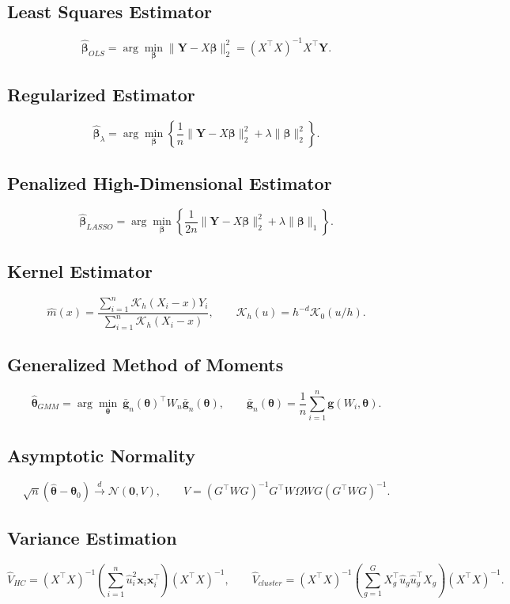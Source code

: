 \documentclass[11pt]{article}
\begin{document}
\subsection{Least Squares Estimator}
\[
\hat{\bm{\beta}}_{OLS}=\arg\min_{\bm{\beta}}\|\bm{Y}-X\bm{\beta}\|_2^2=(X^\top X)^{-1}X^\top\bm{Y}.
\]

\subsection{Regularized Estimator}
\[
\hat{\bm{\beta}}_{\lambda}=\arg\min_{\bm{\beta}}\left\{\frac{1}{n}\|\bm{Y}-X\bm{\beta}\|_2^2+\lambda\|\bm{\beta}\|_2^2\right\}.
\]

\subsection{Penalized High-Dimensional Estimator}
\[
\hat{\bm{\beta}}_{LASSO}=\arg\min_{\bm{\beta}}\left\{\frac{1}{2n}\|\bm{Y}-X\bm{\beta}\|_2^2+\lambda\|\bm{\beta}\|_1\right\}.
\]

\subsection{Kernel Estimator}

\[
\widehat m(x)
=
\frac{
\sum_{i=1}^{n}\mathcal K_h(X_i-x)Y_i
}{
\sum_{i=1}^{n}\mathcal K_h(X_i-x)
},
\qquad
\mathcal K_h(u)=h^{-d}\mathcal K_0(u/h).
\]

\subsection{Generalized Method of Moments}
\[
\hat{\bm{\theta}}_{GMM}=\arg\min_{\bm{\theta}}\ \bar{\bm{g}}_n(\bm{\theta})^\top W_n\bar{\bm{g}}_n(\bm{\theta}),
\qquad \bar{\bm{g}}_n(\bm{\theta})=\frac1n\sum_{i=1}^n\bm{g}(W_i,\bm{\theta}).
\]

\subsection{Asymptotic Normality}
\[
\sqrt{n}(\hat{\bm{\theta}}-\bm{\theta}_0)\xrightarrow{d}\mathcal{N}(\bm{0},V),
\qquad V=(G^\top WG)^{-1}G^\top W\Omega WG(G^\top WG)^{-1}.
\]

\subsection{Variance Estimation}
\[
\hat V_{HC}=(X^\top X)^{-1}\left(\sum_{i=1}^n \hat u_i^2\bm{x}_i\bm{x}_i^\top\right)(X^\top X)^{-1},
\qquad \hat V_{cluster}= (X^\top X)^{-1}\left(\sum_{g=1}^G X_g^\top\hat u_g\hat u_g^\top X_g\right)(X^\top X)^{-1}.
\]
\end{document}
